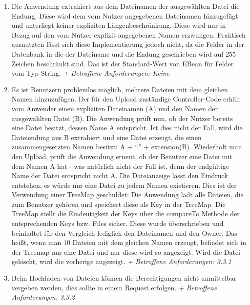 \documentclass[12pt,DIV14,BCOR10mm,a4paper,parskip=half-,headsepline,headinclude,english,ngerman,bibliography=totocnumbered]{scrreprt}
\begin{document}
\begin{enumerate}
\item Die Anwendung extrahiert aus dem Dateinamen der ausgewählten Datei die Endung. Diese wird dem vom Nutzer angegebenen Dateinamen hinzugefügt und unterliegt keiner expliziten Längenbeschränkung. Diese wird nur in Bezug auf den vom Nutzer explizit angegebenen Namen erzwungen. Praktisch ausnutzten lässt sich diese Implementierung jedoch nicht, da die Felder in der Datenbank in die der Dateiname und die Endung geschrieben wird auf 255 Zeichen beschränkt sind. Das ist der Standard-Wert von EBean für Felder vom Typ String. \newline
\textit{+ Betroffene Anforderungen: Keine}


\item Es ist Benutzern problemlos möglich, mehrere Dateien mit dem gleichen Namen hinzuzufügen. Der für den Upload zuständige Controller-Code erhält vom Anwender einen expliziten Dateinamen (A) und den Namen der ausgewählten Datei (B). Die Anwendung prüft nun, ob der Nutzer bereits eine Datei besitzt, dessen Name A entspricht. Ist dies nicht der Fall, wird die Dateiendung aus B extrahiert und eine Datei erzeugt, die einen zusammengesetzten Namen besitzt: A + \enquote{.} + extension(B).
Wiederholt man den Upload, prüft die Anwendung erneut, ob der Benutzer eine Datei mit dem Namen A hat - was natürlich nicht der Fall ist, denn der endgültige Name der Datei entspricht nicht A.
Die Dateianzeige lässt den Eindruck entstehen, es würde nur eine Datei zu jedem Namen existieren. Dies ist der Verwendung einer TreeMap geschuldet: Die Anwendung lädt alle Dateien, die zum Benutzer gehören und speichert diese als Key in der TreeMap. Die TreeMap stellt die Eindeutigkeit der Keys über die compareTo Methode der entsprechenden Keys bzw. Files sicher. Diese wurde überschrieben und beinhaltet für den Vergleich lediglich den Dateinamen und den Owner. Das heißt, wenn man 10 Dateien mit dem gleichen Namen erzeugt, befindet sich in der Treemap nur eine Datei und nur diese wird so angezeigt. Wird die Datei gelöscht, wird die vorherige angezeigt.\newline
\textit{+ Betroffene Anforderungen: 3.3.1}

\item Beim Hochladen von Dateien können die Berechtigungen nicht unmittelbar vergeben werden, dies sollte in einem Request erfolgen.\newline
\textit{+ Betroffene Anforderungen: 3.3.2}
  \end{enumerate}
\end{document}
